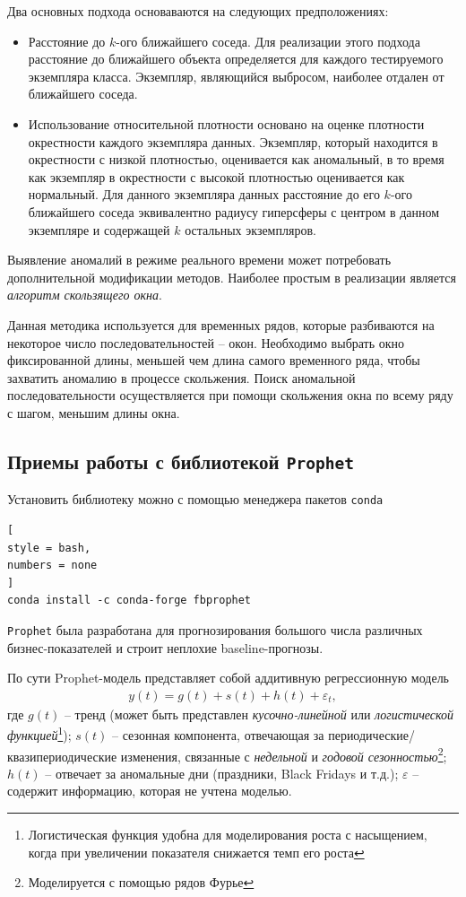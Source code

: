 \documentclass[%
	11pt,
	a4paper,
	utf8,
		]{article}
\begin{document}
Два основных подхода основаваются на следующих предположениях:
\begin{itemize}
	\item Расстояние до $ k $-ого ближайшего соседа. Для реализации этого подхода расстояние до ближайшего объекта определяется для каждого тестируемого экземпляра класса. Экземпляр, являющийся выбросом, наиболее отдален от ближайшего соседа.
	
	\item Использование относительной плотности основано на оценке плотности окрестности каждого экземпляра данных. Экземпляр, который находится в окрестности с низкой плотностью, оценивается как аномальный, в то время как экземпляр в окрестности с высокой плотностью оценивается как нормальный. Для данного экземпляра данных расстояние до его $ k $-ого ближайшего соседа эквивалентно радиусу гиперсферы с центром в данном экземпляре и содержащей $ k $ остальных экземпляров.
\end{itemize}

Выявление аномалий в режиме реального времени может потребовать дополнительной модификации методов. Наиболее простым в реализации является \emph{алгоритм скользящего окна}.

Данная методика используется для временных рядов, которые разбиваются на некоторое число последовательностей -- окон. Необходимо выбрать окно фиксированной длины, меньшей чем длина самого временного ряда, чтобы захватить аномалию в процессе скольжения. Поиск аномальной последовательности осуществляется при помощи скольжения окна по всему ряду с шагом, меньшим длины окна.




\subsection{Приемы работы с библиотекой \texttt{Prophet}}

Установить библиотеку можно с помощью менеджера пакетов \texttt{conda}
\begin{lstlisting}[
style = bash,
numbers = none
]
conda install -c conda-forge fbprophet
\end{lstlisting}

\texttt{Prophet} была разработана для прогнозирования большого числа различных бизнес-показателей и строит неплохие baseline-прогнозы.

По сути Prophet-модель представляет собой аддитивную регрессионную модель
\begin{align*}
	y(t) = g(t) + s(t) + h(t) + \varepsilon_t,
\end{align*}
где $ g(t) $ -- тренд (может быть представлен \emph{кусочно-линейной} или \emph{логистической функцией}\footnote{Логистическая функция удобна для моделирования роста с насыщением, когда при увеличении показателя снижается темп его роста}); $ s(t) $ -- сезонная компонента, отвечающая за периодические/квазипериодические изменения, связанные с \emph{недельной} и \emph{годовой сезонностью}\footnote{Моделируется с помощью рядов Фурье}; $ h(t) $ -- отвечает за аномальные дни (праздники, Black Fridays и т.д.); $ \varepsilon $ -- содержит информацию, которая не учтена моделью.
\end{document}
